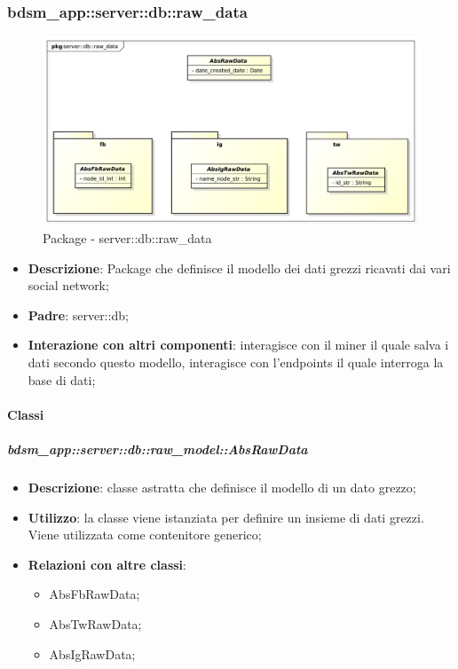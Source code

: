 \subsubsection{bdsm\_app::server::db::raw\_data} %
\label{ssub:bdsm_app_server_raw_model}

	\begin{figure}[htbp]
		\centering
		\centerline{\includegraphics[scale=0.35]{./images/server/raw_data.pdf}}
		\caption{Package - server::db::raw\_data}
	\end{figure}
	\begin{itemize}
	\item \textbf{Descrizione}: Package che definisce il modello dei dati grezzi ricavati dai vari social network;
		\item \textbf{Padre}: server::db;
		\item \textbf{Interazione con altri componenti}: interagisce con il miner il quale salva i dati secondo questo modello, interagisce con l'endpoints il quale interroga la base di dati;
	\end{itemize}


	\paragraph{Classi} %


		\subparagraph{bdsm\_app::server::db::raw\_model::AbsRawData} %
		\label{subp:bdsm_app_server_raw_model_AbsRawData}
			\begin{itemize}
				\item \textbf{Descrizione}: classe astratta che definisce il modello di un dato grezzo;
				\item \textbf{Utilizzo}: la classe viene istanziata per definire un insieme di dati grezzi. Viene utilizzata come contenitore generico;
				\item \textbf{Relazioni con altre classi}:
					\begin{itemize}
						\item AbsFbRawData;
						\item AbsTwRawData;
						\item AbsIgRawData;
					\end{itemize}
			\end{itemize}



